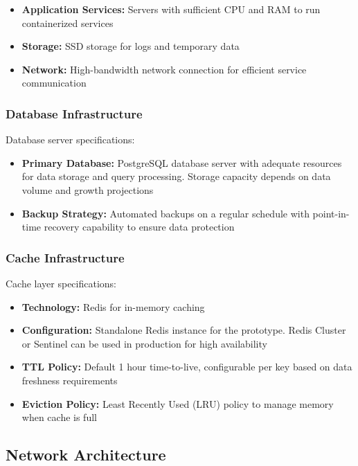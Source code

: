 \begin{itemize}
    \item \textbf{Application Services:} Servers with sufficient CPU and RAM to run containerized services 
    \item \textbf{Storage:} SSD storage for logs and temporary data 
    \item \textbf{Network:} High-bandwidth network connection for efficient service communication
\end{itemize}

\subsubsection{Database Infrastructure}
Database server specifications:

\begin{itemize}
    \item \textbf{Primary Database:} PostgreSQL database server with adequate resources for data storage and query processing. Storage capacity depends on data volume and growth projections
    \item \textbf{Backup Strategy:} Automated backups on a regular schedule with point-in-time recovery capability to ensure data protection
\end{itemize}

\subsubsection{Cache Infrastructure}
Cache layer specifications:

\begin{itemize}
    \item \textbf{Technology:} Redis for in-memory caching
    \item \textbf{Configuration:} Standalone Redis instance for the prototype. Redis Cluster or Sentinel can be used in production for high availability
    \item \textbf{TTL Policy:} Default 1 hour time-to-live, configurable per key based on data freshness requirements
    \item \textbf{Eviction Policy:} Least Recently Used (LRU) policy to manage memory when cache is full
\end{itemize}

\subsection{Network Architecture}

